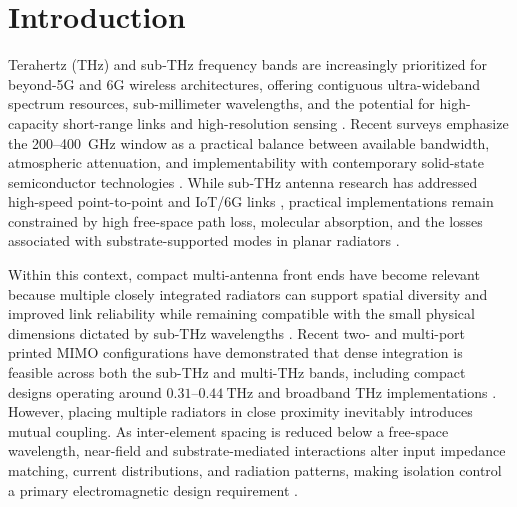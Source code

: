 \documentclass[referee,pdflatex,sn-mathphys-ay]{sn-jnl}
\begin{document}
\section{Introduction}
\label{sec:introduction}

Terahertz (THz) and sub-THz frequency bands are increasingly prioritized for beyond-5G and 6G wireless architectures, offering contiguous ultra-wideband spectrum resources, sub-millimeter wavelengths, and the potential for high-capacity short-range links and high-resolution sensing \citep{thomas2024,jornet2024}. Recent surveys emphasize the 200--400~GHz window as a practical balance between available bandwidth, atmospheric attenuation, and implementability with contemporary solid-state semiconductor technologies \citep{thomas2024}. While sub-THz antenna research has addressed high-speed point-to-point and IoT/6G links \citep{vettikalladi2019,vettikalladi2021}, practical implementations remain constrained by high free-space path loss, molecular absorption, and the losses associated with substrate-supported modes in planar radiators \citep{thomas2024,khezzar_pbg_2021,li_triband_2024,babaahmed_hybrid_2025,ji2024}.

Within this context, compact multi-antenna front ends have become relevant because multiple closely integrated radiators can support spatial diversity and improved link reliability while remaining compatible with the small physical dimensions dictated by sub-THz wavelengths \citep{khaleel2022,gupta2022,azzouz2025}. Recent two- and multi-port printed MIMO configurations have demonstrated that dense integration is feasible across both the sub-THz and multi-THz bands, including compact designs operating around \(0.31\)--\(0.44~\mathrm{THz}\) and broadband THz implementations \citep{khaleel2022,gupta2022,azzouz2025,babu2021,tripathi2023,nirob2025,kavitha2025,abolade2026}. However, placing multiple radiators in close proximity inevitably introduces mutual coupling. As inter-element spacing is reduced below a free-space wavelength, near-field and substrate-mediated interactions alter input impedance matching, current distributions, and radiation patterns, making isolation control a primary electromagnetic design requirement \citep{khaleel2022,babu2021,heliyon2024}.
\end{document}

